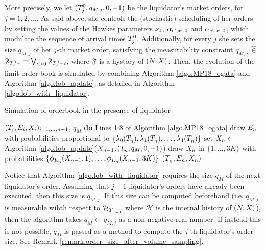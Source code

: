 \documentclass[10pt]{article}
\begin{document}
More precisely, we let $(\arrivalTimes[0]_j, q_{M,j},0,-1)$ be the liquidator's market orders, for $j=1,2,\dots$. As said above, she controls the (stochastic) scheduling of her orders by setting the values of the Hawkes parameters $\baseRate_0$, $\impCoef_{\eone,\xone,0}$ and $\impCoef_{\eone,\xone,0}$, which modulate the sequence of arrival times $\arrivalTimes[0]_j$. Additionally, for every $j$ she sets the size $q_{M,j}$ of her $j$-th market order, satisfying the measurability constraint $q_{M,j} \, \hat{\in} \, $ $ \filtrationF_{\arrivalTimes[0]_j -} = \bigvee_{\epsilon>0}\filtrationF_{\arrivalTimes[0]_j -\epsilon}$, where $\filtrationF$ is a hystory of $(\multiCountingProc,\stateVariable)$.  Then, the evolution of the limit order book is simulated by combining Algorithm \ref{algo.MP18_ogata} and Algorithm \ref{algo.lob_update}, as detailed in Algorithm \ref{algo.lob_with_liquidator}.

\begin{algorithm}[h]
\caption{Simulation of orderbook in the presence of liquidator}
\label{algo.lob_with_liquidator}
 \begin{algorithmic}[5]
  \REQUIRE $(\arrivalTimes[]_i,\event[i],\stateVariable_i)_{i=1,\dots,n-1}$, $q_M$
  \STATE \textbf{do} Lines 1:8 of Algorithm \ref{algo.MP18_ogata}
  \STATE draw $\event[n]$ with probabilities proportional to $\lbrace \intensity[0](\arrivalTimes[]_n),\intensity[1](\arrivalTimes[]_n),\dots,\intensity[4](\arrivalTimes[]_n)\rbrace$
  \STATE set $\stateVariable_n \leftarrow$ Algorithm \ref{algo.lob_update}($\stateVariable_{n-1}$,$(\arrivalTimes[]_n,q_M,0,-1)$)
  \ELSE
  \STATE draw $\stateVariable_n$ in $\lbrace 1,\dots,3K\rbrace$ with probabilities $\lbrace \transProb_{\event}(\stateVariable_{n-1},1), \dots,\transProb_{\event}(\stateVariable_{n-1},3K)\rbrace$
  \ENDIF
  \RETURN $(\arrivalTimes[]_n,\event[n],\stateVariable_n)$
 \end{algorithmic}
\end{algorithm}

\begin{remark}
 Notice that Algorithm \ref{algo.lob_with_liquidator} requires the size $q_M$ of the next liquidator's order. Assuming that $j-1$ liquidator's orders have already been executed, then this size is $q_{M,j}$. If this size can be computed beforehand (i.e. $q_{M,j}$ is measurable wihth respect to $\mathcal{H}_{\arrivalTimes[]_{n-1}}$ where $\mathcal{H}$ is the internal history of $(\multiCountingProc,\stateVariable)$), then the algorithm takes  $q_M \leftarrow q_{M,j}$ as a non-negative real number. If instead this is not possible, $q_M$ is passed as a method to compute the $j$-th liquidator's order size. See Remark \ref{remark.order_size_after_volume_sampling}. 
\end{remark}
\end{document}
